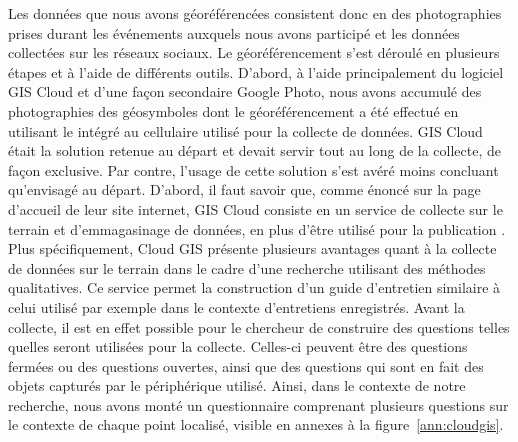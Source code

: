 Les données que nous avons géoréférencées consistent donc en des photographies prises durant les événements \lgbt{} auxquels nous avons participé et les données collectées sur les réseaux sociaux. 
Le géoréférencement s'est déroulé en plusieurs étapes et à l'aide de différents outils. 
D'abord, à l'aide principalement du logiciel GIS Cloud et d'une façon secondaire Google Photo, nous avons accumulé des photographies des géosymboles dont le géoréférencement a été effectué en utilisant le \gps{} intégré au cellulaire utilisé pour la collecte de données. 
GIS Cloud était la solution retenue au départ et devait servir tout au long de la collecte, de façon exclusive. 
Par contre, l'usage de cette solution s'est avéré moins concluant qu'envisagé au départ. 
D'abord, il faut savoir que, comme énoncé sur la page d'accueil de leur site internet, GIS Cloud consiste en un service de collecte sur le terrain et d’emmagasinage de données, en plus d'être utilisé pour la publication \citep{Cloud2014}. 
Plus spécifiquement, Cloud GIS présente plusieurs avantages quant à la collecte de données sur le terrain dans le cadre d'une recherche utilisant des méthodes qualitatives. 
Ce service permet la construction d'un guide d'entretien similaire à celui utilisé par exemple dans le contexte d'entretiens enregistrés. 
Avant la collecte, il est en effet possible pour le chercheur de construire des questions telles quelles seront utilisées pour la collecte.
Celles-ci peuvent être des questions fermées ou des questions ouvertes, ainsi que des questions qui sont en fait des objets capturés par le périphérique utilisé. 
Ainsi, dans le contexte de notre recherche, nous avons monté un questionnaire comprenant plusieurs questions sur le contexte de chaque point localisé, visible en annexes à la figure~\ref{ann:cloudgis}.


